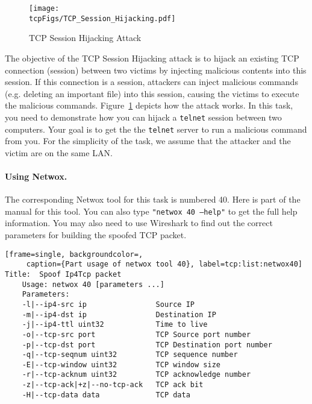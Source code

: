 \begin{figure}[htb]
  \begin{center}
    \texttt{[image: \\tcpFigs/TCP\_Session\_Hijacking.pdf]}
  \end{center}
  \caption{TCP Session Hijacking Attack}
  \label{tcp:fig:hijacking}
\end{figure}
 
   
The objective of the TCP Session Hijacking attack is to hijack an 
existing TCP connection (session) between two victims by injecting malicious contents
into this session. If this connection is a \telnet session, attackers
can inject malicious commands (e.g. deleting an important file) 
into this session, causing the victims 
to execute the malicious commands. 
Figure~\ref{tcp:fig:hijacking} depicts how the attack works.
In this task, you need to demonstrate how you can hijack a 
\texttt{telnet} session between two computers. Your goal is to get the
the \texttt{telnet} server to run a malicious command from you.
For the simplicity of the task, we assume that 
the attacker and the victim are on the same LAN.



\paragraph{Using Netwox.}
The corresponding Netwox tool for this task is numbered 40. Here is part of
the manual for this tool. You can also type {\tt "netwox 40 --help"}
to get the full help information. You may also need to use Wireshark
to find out the correct parameters for building the spoofed TCP packet.

\begin{lstlisting}[frame=single, backgroundcolor=,
     caption={Part usage of netwox tool 40}, label=tcp:list:netwox40]
Title:  Spoof Ip4Tcp packet   
    Usage: netwox 40 [parameters ...]
    Parameters:
    -l|--ip4-src ip                Source IP      
    -m|--ip4-dst ip                Destination IP    
    -j|--ip4-ttl uint32            Time to live 
    -o|--tcp-src port              TCP Source port number    
    -p|--tcp-dst port              TCP Destination port number    
    -q|--tcp-seqnum uint32         TCP sequence number
    -E|--tcp-window uint32         TCP window size
    -r|--tcp-acknum uint32         TCP acknowledge number 
    -z|--tcp-ack|+z|--no-tcp-ack   TCP ack bit
    -H|--tcp-data data             TCP data
\end{lstlisting}


